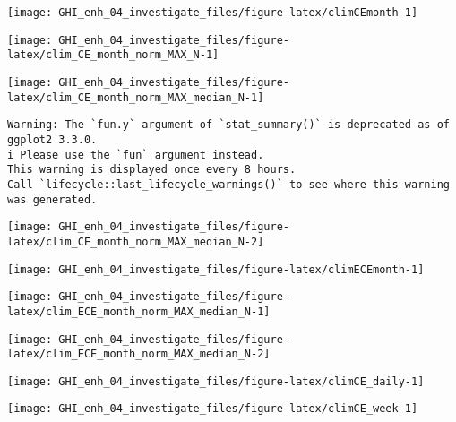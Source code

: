 \documentclass[
  10pt,
  a4paper,oneside]{article}
\begin{document}
\begin{center}\texttt{[image: GHI\_enh\_04\_investigate\_files/figure-latex/climCEmonth-1]} \end{center}

\begin{center}\texttt{[image: GHI\_enh\_04\_investigate\_files/figure-latex/clim\_CE\_month\_norm\_MAX\_N-1]} \end{center}

\begin{center}\texttt{[image: GHI\_enh\_04\_investigate\_files/figure-latex/clim\_CE\_month\_norm\_MAX\_median\_N-1]} \end{center}

\begin{verbatim}
Warning: The `fun.y` argument of `stat_summary()` is deprecated as of ggplot2 3.3.0.
i Please use the `fun` argument instead.
This warning is displayed once every 8 hours.
Call `lifecycle::last_lifecycle_warnings()` to see where this warning was generated.
\end{verbatim}

\begin{center}\texttt{[image: GHI\_enh\_04\_investigate\_files/figure-latex/clim\_CE\_month\_norm\_MAX\_median\_N-2]} \end{center}

\begin{center}\texttt{[image: GHI\_enh\_04\_investigate\_files/figure-latex/climECEmonth-1]} \end{center}

\begin{center}\texttt{[image: GHI\_enh\_04\_investigate\_files/figure-latex/clim\_ECE\_month\_norm\_MAX\_median\_N-1]} \end{center}

\begin{center}\texttt{[image: GHI\_enh\_04\_investigate\_files/figure-latex/clim\_ECE\_month\_norm\_MAX\_median\_N-2]} \end{center}

\begin{center}\texttt{[image: GHI\_enh\_04\_investigate\_files/figure-latex/climCE\_daily-1]} \end{center}

\begin{center}\texttt{[image: GHI\_enh\_04\_investigate\_files/figure-latex/climCE\_week-1]} \end{center}
\end{document}

